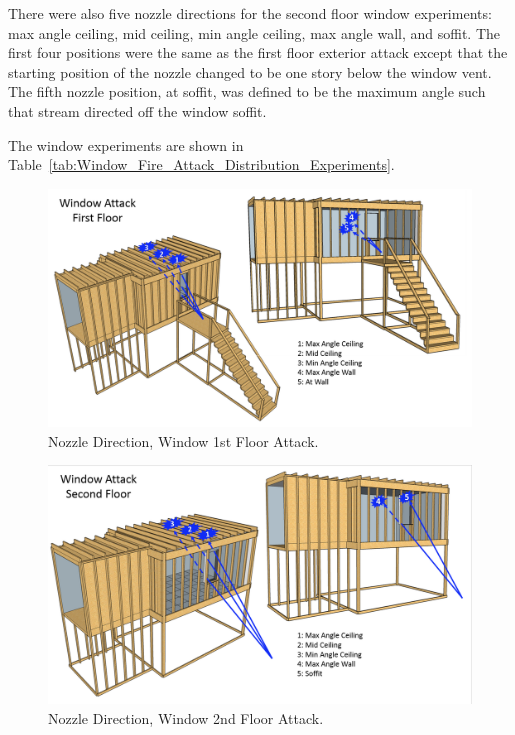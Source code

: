 \documentclass[12pt,oneside]{book}
\begin{document}
There were also five nozzle directions for the second floor window experiments: max angle ceiling, mid ceiling, min angle ceiling, max angle wall, and soffit. The first four positions were the same as the first floor exterior attack except that the starting position of the nozzle changed to be one story below the window vent. The fifth nozzle position, at soffit, was defined to be the maximum angle such that stream directed off the window soffit.

The window experiments are shown in Table~\ref{tab:Window_Fire_Attack_Distribution_Experiments}.

\begin{figure}[!ht]
	\centering
	\includegraphics[width=\columnwidth]{Figures/Water_Distribution/Nozzle_Position_ExtFirstfloor}
	\caption[Nozzle Direction, Window 1st Floor Attack]{Nozzle Direction, Window 1st Floor Attack.}
	\label{fig:Nozzle_Direction_Window_1st_Floor_Attack}
\end{figure}

\begin{figure}[!ht]
	\centering
	\includegraphics[width=\columnwidth]{Figures/Water_Distribution/Nozzle_Position_ExtSecondfloor}
	\caption[Nozzle Direction, Window 2nd Floor Attack]{Nozzle Direction, Window 2nd Floor Attack.}
	\label{fig:Nozzle_Direction_Window_2nd_Floor_Attack}
\end{figure}
\end{document}
